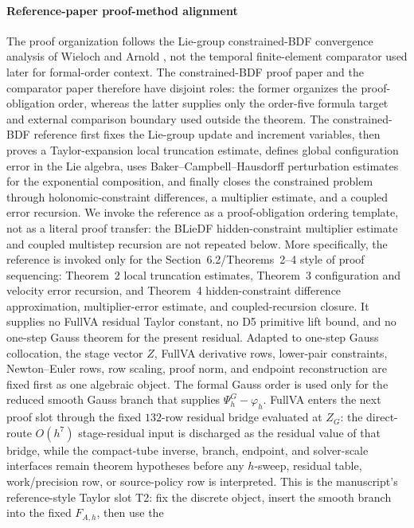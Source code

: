 \documentclass[preprint,12pt]{elsarticle}
\begin{document}
\paragraph{Reference-paper proof-method alignment}
The proof organization follows the Lie-group constrained-BDF convergence
analysis of Wieloch and Arnold \cite{wieloch2021bdf}, not the temporal
finite-element comparator used later for formal-order context.  The
constrained-BDF proof paper and the comparator paper therefore have disjoint
roles: the former organizes the proof-obligation order, whereas the latter supplies
only the order-five formula target and external comparison boundary used
outside the theorem.  The constrained-BDF reference
first fixes the Lie-group update and increment variables, then proves a
Taylor-expansion local truncation estimate, defines global configuration error
in the Lie algebra, uses Baker--Campbell--Hausdorff perturbation estimates for
the exponential composition, and finally closes the constrained problem through
holonomic-constraint differences, a multiplier estimate, and a coupled error
recursion.  We invoke the reference as a proof-obligation ordering template, not
as a literal proof transfer: the BLieDF hidden-constraint multiplier estimate
and coupled multistep recursion are not repeated below.  More specifically,
the reference is invoked only for the Section~6.2/Theorems~2--4 style of proof
sequencing: Theorem~2 local truncation estimates, Theorem~3 configuration and
velocity error recursion, and Theorem~4 hidden-constraint difference
approximation, multiplier-error estimate, and coupled-recursion closure.
It supplies no FullVA residual Taylor
constant, no D5 primitive lift bound, and no one-step Gauss theorem for the
present residual.  Adapted to one-step
Gauss collocation, the stage vector \(Z\), FullVA derivative rows, lower-pair
constraints, Newton--Euler rows, row scaling, proof norm, and endpoint
reconstruction are fixed first as one algebraic object.  The formal Gauss
order is used only for the reduced smooth Gauss branch that supplies
\(\Psi_h^G-\varphi_h\).  FullVA enters the next proof slot through the fixed
\(132\)-row residual bridge evaluated at \(Z_G\): the direct-route
\(O(h^7)\) stage-residual input is discharged as the residual value of that
bridge, while the compact-tube inverse, branch, endpoint, and solver-scale
interfaces remain theorem hypotheses before any \(h\)-sweep, residual table,
work/precision row, or source-policy row is interpreted.
This is the manuscript's reference-style Taylor slot T2: fix the discrete
object, insert the smooth branch into the fixed \(F_{A,h}\), then use the
\end{document}
